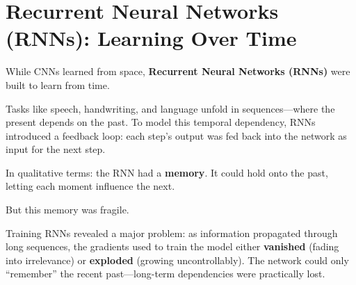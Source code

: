\section{Recurrent Neural Networks (RNNs): Learning Over Time}

While CNNs learned from space, \textbf{Recurrent Neural Networks (RNNs)} were built to learn from time.

Tasks like speech, handwriting, and language unfold in sequences—where the present depends on the past. To model this temporal dependency, RNNs introduced a feedback loop: each step’s output was fed back into the network as input for the next step.

In qualitative terms: the RNN had a \textbf{memory}. It could hold onto the past, letting each moment influence the next.

But this memory was fragile.

Training RNNs revealed a major problem: as information propagated through long sequences, the gradients used to train the model either \textbf{vanished} (fading into irrelevance) or \textbf{exploded} (growing uncontrollably). The network could only “remember” the recent past—long-term dependencies were practically lost.
